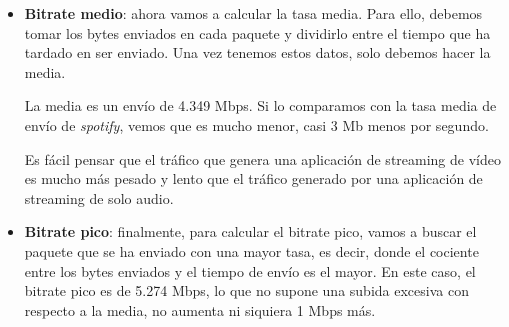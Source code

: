\documentclass[11pt,a4paper]{article}
\begin{document}
\begin{itemize}
	\item \textbf{Bitrate medio}: ahora vamos a calcular la tasa media. Para ello, debemos tomar los bytes enviados en cada paquete y dividirlo entre el tiempo que ha tardado en ser enviado. Una vez tenemos estos datos, solo debemos hacer la media.
	
	La media es un envío de 4.349 Mbps. Si lo comparamos con la tasa media de envío de \textit{spotify}, vemos que es mucho menor, casi 3 Mb menos por segundo.
	
	Es fácil pensar que el tráfico que genera una aplicación de streaming de vídeo es mucho más pesado y lento que el tráfico generado por una aplicación de streaming de solo audio.
	
	\item \textbf{Bitrate pico}: finalmente, para calcular el bitrate pico, vamos a buscar el paquete que se ha enviado con una mayor tasa, es decir, donde el cociente entre los bytes enviados y el tiempo de envío es el mayor. En este caso, el bitrate pico es de 5.274 Mbps, lo que no supone una subida excesiva con respecto a la media, no aumenta ni siquiera 1 Mbps más.
\end{itemize}
\end{document}
